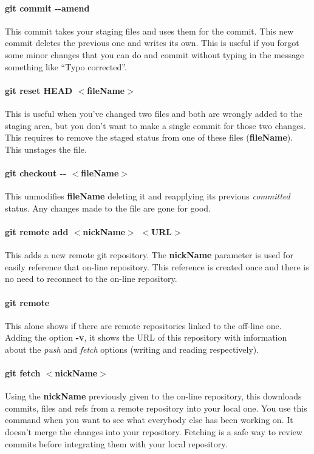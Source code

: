 \documentclass[a4paper, 12pt]{article}
\begin{document}
\paragraph{git commit -{}-amend} This commit takes your staging files and uses them for the commit. This new commit deletes the previous one and writes its own. This is useful if you forgot some minor changes that you can do and commit without typing in the message something like ``Typo corrected''.

\paragraph{git reset HEAD $<$fileName$>$} This is useful when you've changed two files and both are wrongly added to the staging area, but you don't want to make a single commit for those two changes. This requires to remove the staged status from one of these files (\textbf{fileName}). This unstages the file.

\paragraph{git checkout -{}- $<$fileName$>$} This unmodifies \textbf{fileName} deleting it and reapplying its previous \emph{committed} status. Any changes made to the file are gone for good.

\paragraph{git remote add $<$nickName$>$ $<$URL$>$}  This adds a new remote git repository. The \textbf{nickName} parameter is used for easily reference that on-line repository. This reference is created once and there is no need to reconnect to the on-line repository.

\paragraph{git remote} This alone shows if there are remote repositories linked to the off-line one. Adding the option \textbf{-v}, it shows the URL of this repository with information about the \emph{push} and \emph{fetch} options (writing and reading respectively).

\paragraph{git fetch $<$nickName$>$} Using the \textbf{nickName} previously given to the on-line repository, this downloads commits, files and refs from a remote repository into your local one. You use this command when you want to see what everybody else has been working on. It doesn't merge the changes into your repository. Fetching is a safe way to review commits before integrating them with your local repository.
\end{document}
